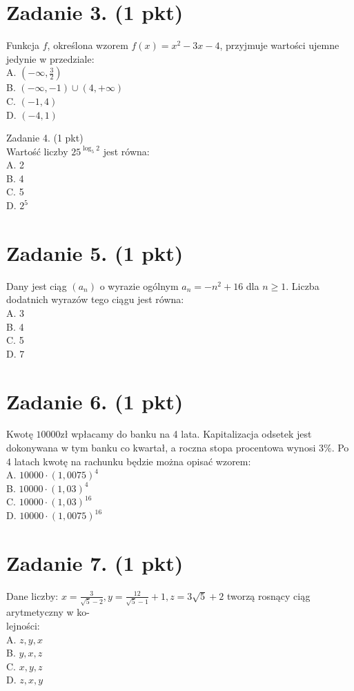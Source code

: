 \documentclass[10pt]{article}
\begin{document}
\section*{Zadanie 3. (1 pkt)}
Funkcja \(f\), określona wzorem \(f(x)=x^{2}-3 x-4\), przyjmuje wartości ujemne jedynie w przedziale:\\
A. \(\left(-\infty, \frac{3}{2}\right)\)\\
B. \((-\infty,-1) \cup(4,+\infty)\)\\
C. \((-1,4)\)\\
D. \((-4,1)\)

Zadanie 4. (1 pkt)\\
Wartość liczby \(25^{\log _{5} 2}\) jest równa:\\
A. 2\\
B. 4\\
C. 5\\
D. \(2^{5}\)

\section*{Zadanie 5. (1 pkt)}
Dany jest ciąg \(\left(a_{n}\right)\) o wyrazie ogólnym \(a_{n}=-n^{2}+16\) dla \(n \geq 1\). Liczba dodatnich wyrazów tego ciągu jest równa:\\
A. 3\\
B. 4\\
C. 5\\
D. 7

\section*{Zadanie 6. (1 pkt)}
Kwotę \(10000 \mathrm{zł}\) wpłacamy do banku na 4 lata. Kapitalizacja odsetek jest dokonywana w tym banku co kwartał, a roczna stopa procentowa wynosi \(3 \%\). Po 4 latach kwotę na rachunku będzie można opisać wzorem:\\
A. \(10000 \cdot(1,0075)^{4}\)\\
B. \(10000 \cdot(1,03)^{4}\)\\
C. \(10000 \cdot(1,03)^{16}\)\\
D. \(10000 \cdot(1,0075)^{16}\)

\section*{Zadanie 7. (1 pkt)}
Dane liczby: \(x=\frac{3}{\sqrt{5}-2}, y=\frac{12}{\sqrt{5}-1}+1, z=3 \sqrt{5}+2\) tworzą rosnący ciąg arytmetyczny w ko-\\
lejności:\\
A. \(z, y, x\)\\
B. \(y, x, z\)\\
C. \(x, y, z\)\\
D. \(z, x, y\)
\end{document}
